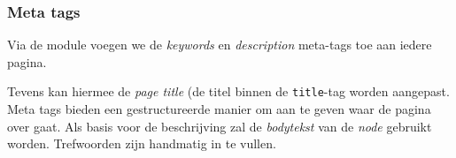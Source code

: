 \subsubsection{Meta tags}\label{nodewords}
Via de  module voegen we de \textit{keywords} en \textit{description} meta-tags toe aan iedere pagina. 

Tevens kan hiermee de \emph{page title} (de titel binnen de \texttt{title}-tag worden aangepast. Meta tags bieden een gestructureerde manier om aan te geven waar de pagina over gaat. Als basis voor de beschrijving zal de \textit{bodytekst} van de \textit{node} gebruikt worden. Trefwoorden zijn handmatig in te vullen.